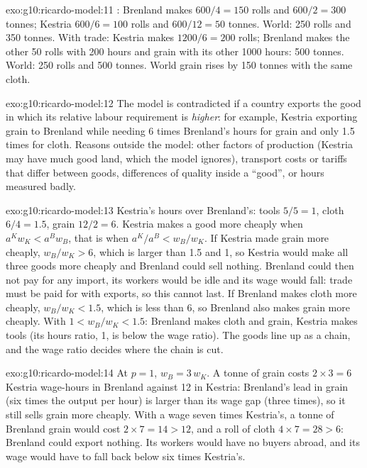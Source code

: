 \begin{solution}{exo:g10:ricardo-model:11}
: Brenland makes $600/4 = 150$ rolls and $600/2 = 300$ tonnes; Kestria $600/6 = 100$ rolls and $600/12 = 50$
tonnes. World: 250 rolls and 350 tonnes. With trade: Kestria makes $1200/6 = 200$ rolls; Brenland makes the other 50
rolls with 200 hours and grain with its other \num{1000} hours: 500 tonnes. World: 250 rolls and 500 tonnes. World
grain rises by 150 tonnes with the same cloth.
\end{solution}

\begin{solution}{exo:g10:ricardo-model:12}
The model is contradicted if a country exports the good in which its relative labour requirement is \emph{higher}:
for example, Kestria exporting grain to Brenland while needing 6 times Brenland's hours for grain and only 1.5 times
for cloth. Reasons outside the model: other factors of production (Kestria may have much good land, which the model
ignores), transport costs or tariffs that differ between goods, differences of quality inside a ``good'', or hours
measured badly.
\end{solution}

\begin{solution}{exo:g10:ricardo-model:13}
Kestria's hours over Brenland's: tools $5/5 = 1$, cloth $6/4 = 1.5$, grain $12/2 = 6$. Kestria makes a good more
cheaply when $a^K w_K < a^B w_B$, that is when $a^K/a^B < w_B/w_K$. If Kestria made grain more cheaply, $w_B/w_K > 6$,
which is larger than 1.5 and 1, so Kestria would make all three goods more cheaply and Brenland could sell nothing.
Brenland could then not pay for any import, its workers would be idle and its wage would fall: trade must be paid for
with exports, so this cannot last. If Brenland makes cloth more cheaply, $w_B/w_K < 1.5$, which is less than 6, so
Brenland also makes grain more cheaply. With $1 < w_B/w_K < 1.5$: Brenland makes cloth and grain, Kestria makes tools
(its hours ratio, 1, is below the wage ratio). The goods line up as a chain, and the wage ratio decides where the chain
is cut.
\end{solution}

\begin{solution}{exo:g10:ricardo-model:14}
At $p = 1$, $w_B = 3\,w_K$. A tonne of grain costs $2 \times 3 = 6$ Kestria wage-hours in Brenland against 12 in
Kestria: Brenland's lead in grain (six times the output per hour) is larger than its wage gap (three times), so it
still sells grain more cheaply. With a wage seven times Kestria's, a tonne of Brenland grain would cost $2 \times 7 =
14 > 12$, and a roll of cloth $4 \times 7 = 28 > 6$: Brenland could export nothing. Its workers would have no buyers
abroad, and its wage would have to fall back below six times Kestria's.
\end{solution}

